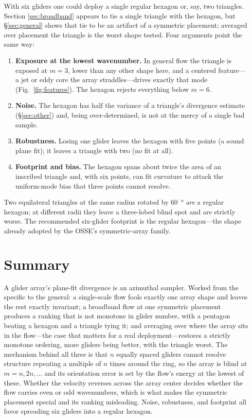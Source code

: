 \documentclass[11pt]{article}
\begin{document}
With six gliders one could deploy a single regular hexagon or, say, two triangles. Section
\ref{sec:broadband} appears to tie a single triangle with the hexagon, but \S\ref{sec:general}
shows that tie to be an artifact of a symmetric placement; averaged over placement the triangle
is the worst shape tested. Four arguments point the same way:
\begin{enumerate}[leftmargin=1.5em,nosep]
\item \textbf{Exposure at the lowest wavenumber.} In general flow the triangle is exposed at
$m=3$, lower than any other shape here, and a centered feature---a jet or eddy core the array
straddles---drives exactly that mode (Fig.~\ref{fig:features}). The hexagon rejects everything
below $m=6$.
\item \textbf{Noise.} The hexagon has half the variance of a triangle's divergence estimate
(\S\ref{sec:other}) and, being over-determined, is not at the mercy of a single bad sample.
\item \textbf{Robustness.} Losing one glider leaves the hexagon with five points (a sound plane
fit); it leaves a triangle with two (no fit at all).
\item \textbf{Footprint and bias.} The hexagon spans about twice the area of an inscribed
triangle and, with six points, can fit curvature to attack the uniform-mode bias that three
points cannot resolve.
\end{enumerate}
Two equilateral triangles at the same radius rotated by \SI{60}{\degree} \emph{are} a regular
hexagon; at different radii they leave a three-lobed blind spot and are strictly worse. The
recommended six-glider footprint is the regular hexagon---the shape already adopted by the OSSE's
symmetric-array family.

\section{Summary}
\label{sec:summary}

A glider array's plane-fit divergence is an azimuthal sampler. Worked from the specific to the
general: a single-scale flow fools exactly one array shape and leaves the rest exactly
invariant; a broadband flow at one symmetric placement produces a ranking that is not monotone
in glider number, with a pentagon beating a hexagon and a triangle tying it; and averaging over
where the array sits in the flow---the case that matters for a real deployment---restores a
strictly monotone ordering, more gliders being better, with the triangle worst. The mechanism
behind all three is that $n$ equally spaced gliders cannot resolve structure repeating a
multiple of $n$ times around the ring, so the array is blind at $m=n,2n,\dots$ and its
orientation error is set by the flow's energy at the lowest of these. Whether the velocity
reverses across the array center decides whether the flow carries even or odd wavenumbers, which
is what makes the symmetric placement special and its ranking misleading. Noise, robustness, and
footprint all favor spreading six gliders into a regular hexagon.
\end{document}
